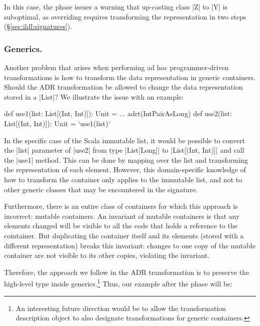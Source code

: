 In this case, the \bridge{} phase issues a warning that up-casting class |Z| to |Y| is suboptimal, as overriding requires transforming the representation in two steps (\S\ref{sec:ildl:signatures}).


\subsubsection{Generics.}
Another problem that arises when performing ad hoc programmer-driven transformations is how to transform the data representation in generic containers. Should the ADR transformation be allowed to change the data representation stored in a |List|? We illustrate the issue with an example:

\begin{lstlisting-nobreak}
def use1(list: List[(Int, Int)]): Unit = ...
adrt(IntPairAsLong) {
  def use2(list: List[(Int, Int)]): Unit = `use1(list)`
}
\end{lstlisting-nobreak}

In the specific case of the Scala immutable list, it would be possible to convert the |list| parameter of |use2| from type |List[Long]| to |List[(Int, Int)]| and call the |use1| method. This can be done by mapping over the list and transforming the representation of each element. However, this domain-specific knowledge of how to transform the container only applies to the immutable list, and not to other generic classes that may be encountered in the signature.

Furthermore, there is an entire class of containers for which this approach is incorrect: mutable containers. An invariant of mutable containers is that any elements changed will be visible to all the code that holds a reference to the cointainer. But duplicating the container itself and its elements (stored with a different representation) breaks this invariant: changes to one copy of the mutable container are not visible to its other copies, violating the invariant.

Therefore, the approach we follow in the ADR transformation is to
preserve the high-level type inside generics.\footnote{An interesting
  future direction would be to allow the transformation description
  object to also designate transformations for generic containers.}
Thus, our example after the \commit{} phase will be:

